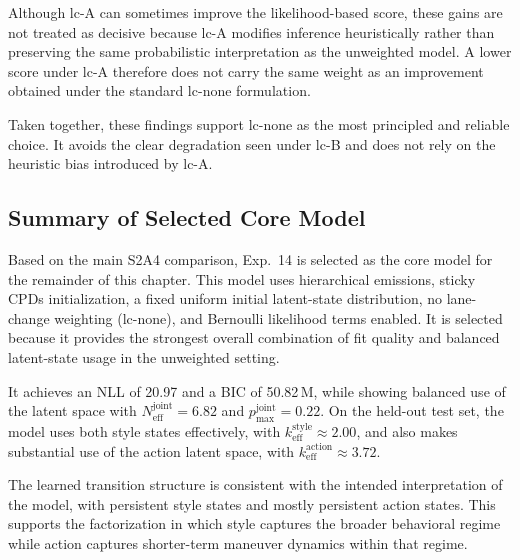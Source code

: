 \par Although lc-A can sometimes improve the likelihood-based score, these gains are not treated as decisive because lc-A modifies inference heuristically rather 
than preserving the same probabilistic interpretation as the unweighted model. 
A lower score under lc-A therefore does not carry the same weight as an improvement obtained under the standard lc-none formulation.

\par Taken together, these findings support lc-none as the most principled and reliable choice.  
It avoids the clear degradation seen under lc-B and does not rely on the heuristic bias introduced by lc-A. 

\subsection{Summary of Selected Core Model}
Based on the main S2A4 comparison, Exp.~14 is selected as the core model for the remainder of this chapter. 
This model uses hierarchical emissions, sticky \acp{CPD} initialization, a fixed uniform initial latent-state distribution, no lane-change weighting (lc-none), 
and Bernoulli likelihood terms enabled. 
It is selected because it provides the strongest overall combination of fit quality and balanced latent-state usage in the unweighted setting.

\par It achieves an \ac{NLL} of 20.97 and a \ac{BIC} of 50.82\,M, while showing balanced use of the latent space with $N_{\mathrm{eff}}^{\mathrm{joint}} = 6.82$ 
and $p_{\max}^{\mathrm{joint}} = 0.22$. 
On the held-out test set, the model uses both style states effectively, with $k_{\mathrm{eff}}^{\mathrm{style}} \approx 2.00$, and also makes substantial 
use of the action latent space, with $k_{\mathrm{eff}}^{\mathrm{action}} \approx 3.72$.

\par The learned transition structure is consistent with the intended interpretation of the model, 
with persistent style states and mostly persistent action states. 
This supports the factorization in which style captures the broader behavioral regime while action captures shorter-term maneuver dynamics 
within that regime.


